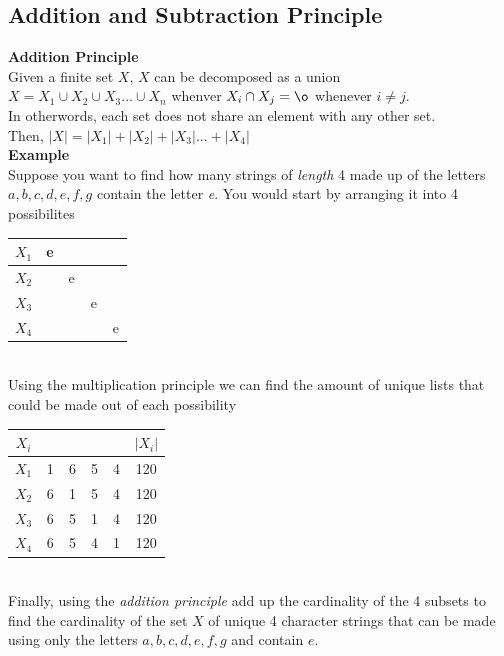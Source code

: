 \documentclass[a4paper,11pt]{article}
\begin{document}
\subsection{Addition and Subtraction Principle}
\textbf{Addition Principle}\\
Given a finite set $X$, $X$ can be decomposed as a union\\
$X=X_1 \cup X_2 \cup X_3 \dots \cup X_n$ whenver $X_i \cap X_j = \o$ whenever $i \neq j$.\\
In otherwords, each set does not share an element with any other set.\vspace{5pt}\\
Then, $|X|=|X_1|+|X_2|+|X_3|...+|X_4|$\vspace{5pt}\\
\textbf{Example}\\
Suppose you want to find how many strings of \textit{length} 4 made up of the letters $a,b,c,d,e,f,g$ contain the letter \textit{e}. You would start by arranging it into 4 possibilites\vspace{5pt}\\
\begin{tabular}{|c|c|c|c|c|}
\hline
 $X_1$ & e & \ & \ & \ \\
 \hline
 $X_2$ & \ & e & \ & \ \\
 \hline
 $X_3$ & \ & \ & e & \ \\
 \hline
 $X_4$ & \ & \ & \ & e \\
\hline
\end{tabular}\vspace{5pt}\\
Using the multiplication principle we can find the amount of unique lists that could be made out of each possibility\vspace{5pt}\\
\begin{tabular}{|c|c|c|c|c|c|}
 \hline
 $X_i$ & \ & \ & \ & \ & $|X_i|$\\
 \hline
 $X_1$ & 1 & 6 & 5 & 4 & 120\\
 \hline
 $X_2$ & 6 & 1 & 5 & 4 & 120\\
 \hline
 $X_3$ & 6 & 5 & 1 & 4 & 120\\
 \hline
 $X_4$ & 6 & 5 & 4 & 1 & 120\\
\hline
\end{tabular}\vspace{5pt}\\
Finally, using the \textit{addition principle} add up the cardinality of the 4 subsets to find the cardinality of the set $X$ of unique 4 character strings that can be made using only the letters $a,b,c,d,e,f,g$ and contain $e$.\vspace{5pt}\\
\end{document}
